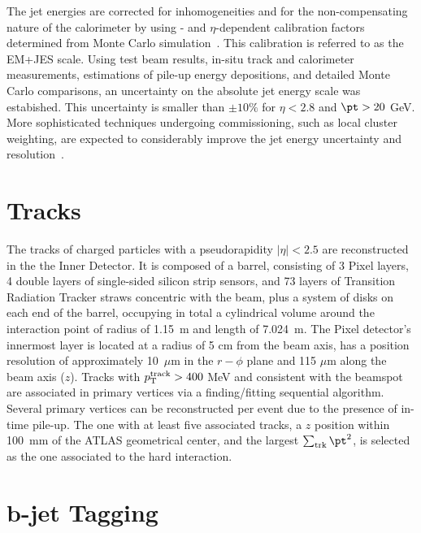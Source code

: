 The jet energies are corrected for inhomogeneities and for
the non-compensating nature of the calorimeter by using \pt- and $\eta$-dependent calibration factors determined from Monte Carlo simulation~\cite{JESnote}. This calibration is referred to as the EM+JES scale.
Using test beam results, in-situ track and calorimeter measurements, estimations of pile-up energy depositions, and detailed Monte Carlo comparisons, an uncertainty on the absolute jet energy scale was estabished. This uncertainty is smaller than $\pm 10\%$ for $\eta < 2.8$ and $\pt > 20$ GeV. More sophisticated techniques undergoing commissioning, such as local cluster weighting, are expected to considerably improve the jet energy uncertainty and resolution~\cite{CSC}. 

\section{Tracks}\label{sec:ObjSelection}


The tracks of charged particles with a pseudorapidity $|\eta| < 2.5$ are reconstructed in the the Inner Detector. It is composed of a barrel, consisting of 3 Pixel layers, 4 double layers of single-sided silicon strip sensors, and 73 layers of Transition Radiation Tracker straws concentric with the beam, plus a system of disks on each end of the barrel, occupying in total a cylindrical volume around the interaction point of radius of 1.15~m and length of 7.024~m. The Pixel detector's innermost layer is located at a radius of 5 cm from the beam axis, has a position resolution of approximately 10~$\mu$m in the $r-\phi$ plane and 115 $\mu$m along the beam axis ($z$). %
Tracks with $p^{\rm{track}}_{\rm{T}} > 400$ MeV and consistent with the beamspot are associated in primary vertices via a finding/fitting sequential algorithm. Several primary vertices can be reconstructed per event due to the presence of in-time pile-up. The one with at least five associated tracks, a $z$ position within 100~mm of the ATLAS geometrical center, and the largest $\sum_{\rm trk}\pt^2$, is selected as the one associated to the hard interaction.

\section{ $\bm b$-jet Tagging}\label{sec:btagging}

